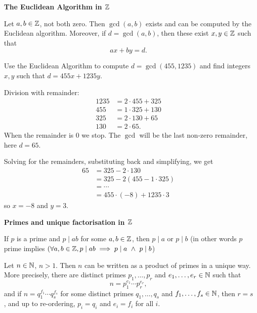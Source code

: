 \documentclass[10pt, a4paper]{article}
\begin{document}
\textbf{The Euclidean Algorithm in $\mathbb{Z}$}

\begin{theorem}
    Let $a, b \in \mathbb{Z}$,
    not both zero.
    Then $\gcd(a, b)$ exists and can be computed by the Euclidean algorithm.
    Moreover,
    if $d = \gcd(a, b)$,
    then these exist $x, y \in \mathbb{Z}$ such that
    \[
    ax + by = d.
    \]
\end{theorem}

\begin{example}
    Use the Euclidean Algorithm to compute $d = \gcd(455, 1235)$ and find integers $x, y$ such that $d = 455x + 1235y$.

    \begin{solution}
        Division with remainder:
        \begin{align*}
            1235 &= 2 \cdot 455 + 325 \\
            455 &= 1 \cdot 325 + 130 \\325 &= 2 \cdot 130 + 65 \\
            130 &= 2 \cdot 65.
        \end{align*}
        When the remainder is $0$ we stop.
        The $\gcd$ will be the last non-zero remainder,
        here $d = 65$.

        Solving for the remainders,
        substituting back and simplifying,
        we get
        \begin{align*}
            65 &= 325 - 2 \cdot 130 \\
            &= 325 - 2(455 - 1 \cdot 325) \\
            &= \dotsi \\
            &= 455 \cdot (-8) + 1235 \cdot 3
        \end{align*}
        so $x = -8$ and $y = 3$.
    \end{solution}
\end{example}

\textbf{Primes and unique factorisation in $\mathbb{Z}$}

\begin{lemma}
    If $p$ is a prime and $p \mid ab$ for some $a, b \in \mathbb{Z}$,
    then $p \mid a$ or $p \mid b$
    (in other words $p$ prime implies $(\forall a, b \in \mathbb{Z}, p \mid ab \implies p \mid a\  \wedge\ p \mid b$)
\end{lemma}

\begin{theorem}
    Let $n \in \mathbb{N}$,
    $n > 1$.
    Then $n$ can be written as a product of primes in a unique way.
    More precisely,
    there are distinct primes $p_1, \dotsc, p_r$ and $e_1, \dotsc, e_r \in \mathbb{N}$ such that
    \[
    n = p_1 ^ {e_1} \dotsi p_r ^ {e_r},
    \]
    and if $n = q_1 ^ {f_1} \dotsi q_s ^ {f_s}$ for some distinct primes $q_1, \dotsc, q_s$ and $f_1, \dotsc, f_s \in \mathbb{N}$,
    then $r = s$,
    and up to re-ordering,
    $p_i = q_i$ and $e_i = f_i$ for all $i$.
\end{theorem}
\end{document}
